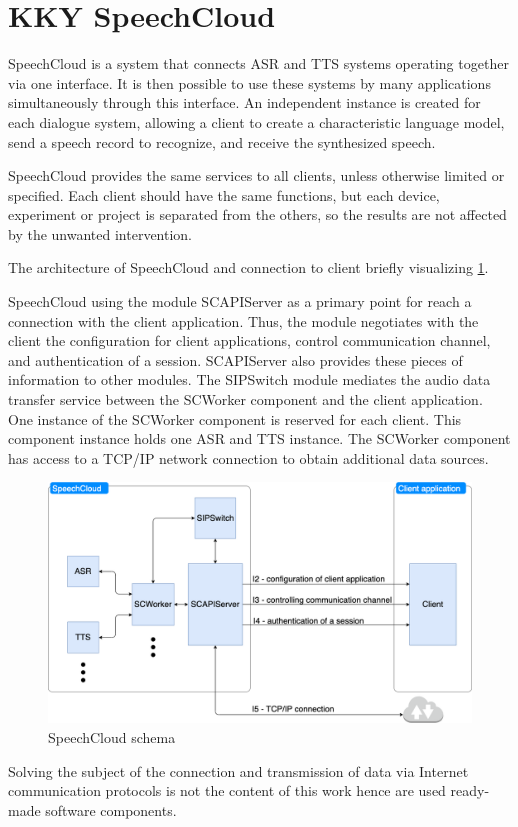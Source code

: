 \section{KKY SpeechCloud}

SpeechCloud is a system that connects ASR and TTS systems operating together via one interface. It is then possible to use these systems by many applications simultaneously through this interface. An independent instance is created for each dialogue system, allowing a client to create a characteristic language model, send a speech record to recognize, and receive the synthesized speech.

SpeechCloud provides the same services to all clients, unless otherwise limited or specified. Each client should have the same functions, but each device, experiment or project is separated from the others, so the results are not affected by the unwanted intervention.

The architecture of SpeechCloud and connection to client briefly visualizing \cref{fig:speechcloud_schema}.

SpeechCloud using the module SCAPIServer as a primary point for reach a connection with the client application. Thus, the module negotiates with the client the configuration for client applications, control communication channel, and authentication of a session. SCAPIServer also provides these pieces of information to other modules. The SIPSwitch module mediates the audio data transfer service between the SCWorker component and the client application. One instance of the SCWorker component is reserved for each client. This component instance holds one ASR and TTS instance. The SCWorker component has access to a TCP/IP network connection to obtain additional data sources.

\begin{figure}[H]
    \centering
    \includegraphics[width=\textwidth]{img/speechcloud_schema.png}
    \caption{SpeechCloud schema}
    \label{fig:speechcloud_schema}
\end{figure}

Solving the subject of the connection and transmission of data via Internet communication protocols is not the content of this work hence are used ready-made software components.